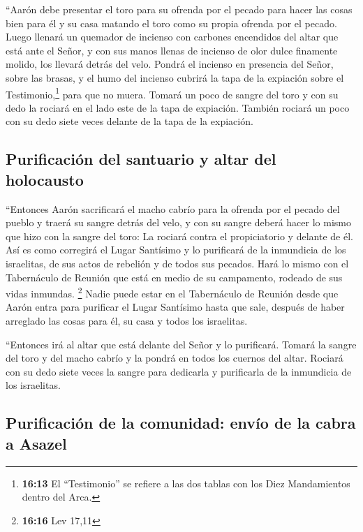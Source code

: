  ``Aarón debe presentar el toro para su ofrenda por el
pecado para hacer las cosas bien para él y su casa matando el toro como
su propia ofrenda por el pecado.  Luego llenará un
quemador de incienso con carbones encendidos del altar que está ante el
Señor, y con sus manos llenas de incienso de olor dulce finamente
molido, los llevará detrás del velo.  Pondrá el incienso
en presencia del Señor, sobre las brasas, y el humo del incienso cubrirá
la tapa de la expiación sobre el Testimonio,\footnote{\textbf{16:13} El
  ``Testimonio'' se refiere a las dos tablas con los Diez Mandamientos
  dentro del Arca.} para que no muera.  Tomará un poco de
sangre del toro y con su dedo la rociará en el lado este de la tapa de
expiación. También rociará un poco con su dedo siete veces delante de la
tapa de la expiación.

\hypertarget{purificaciuxf3n-del-santuario-y-altar-del-holocausto}{%
\subsection{Purificación del santuario y altar del
holocausto}\label{purificaciuxf3n-del-santuario-y-altar-del-holocausto}}

 ``Entonces Aarón sacrificará el macho cabrío para la
ofrenda por el pecado del pueblo y traerá su sangre detrás del velo, y
con su sangre deberá hacer lo mismo que hizo con la sangre del toro: La
rociará contra el propiciatorio y delante de él.  Así es
como corregirá el Lugar Santísimo y lo purificará de la inmundicia de
los israelitas, de sus actos de rebelión y de todos sus pecados. Hará lo
mismo con el Tabernáculo de Reunión que está en medio de su campamento,
rodeado de sus vidas inmundas. \footnote{\textbf{16:16} Lev 17,11}
 Nadie puede estar en el Tabernáculo de Reunión desde que
Aarón entra para purificar el Lugar Santísimo hasta que sale, después de
haber arreglado las cosas para él, su casa y todos los israelitas.

 ``Entonces irá al altar que está delante del Señor y lo
purificará. Tomará la sangre del toro y del macho cabrío y la pondrá en
todos los cuernos del altar.  Rociará con su dedo siete
veces la sangre para dedicarla y purificarla de la inmundicia de los
israelitas.

\hypertarget{purificaciuxf3n-de-la-comunidad-envuxedo-de-la-cabra-a-asazel}{%
\subsection{Purificación de la comunidad: envío de la cabra a
Asazel}\label{purificaciuxf3n-de-la-comunidad-envuxedo-de-la-cabra-a-asazel}}

